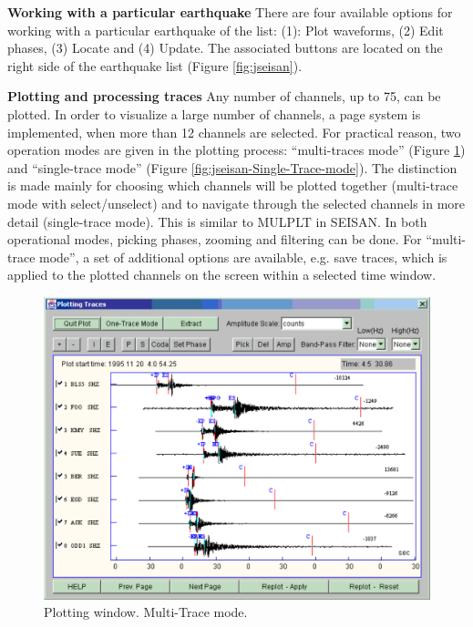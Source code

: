 \textbf{Working with a particular earthquake}\newline
There are four available options for working with a particular earthquake of the list: (1): Plot waveforms, (2) Edit phases, (3) Locate and (4) Update. The associated buttons are located on the right side of the earthquake list (Figure \ref{fig:jseisan}). 

\textbf{Plotting and processing traces}\newline
Any number of channels, up to 75, can be plotted. In order to visualize a large number of channels, a page system is implemented, when more than 12 channels are selected. For practical reason, two operation modes are given in the plotting process: 
``multi-traces mode'' (Figure \ref{fig:jseisan-Multi-Trace-mode}) and ``single-trace mode'' 
(Figure \ref{fig:jseisan-Single-Trace-mode}). 
The distinction is made mainly for choosing which channels will be plotted together (multi-trace mode with select/unselect) and to navigate through the selected channels in more detail (single-trace mode). This is similar to MULPLT in SEISAN. In both operational modes, picking phases, zooming and filtering can be done. For ``multi-trace mode'', a set of additional options are available, e.g. save traces, which is applied to the plotted channels on the screen within a selected time window. 

\begin{figure}
\centerline{\includegraphics[width=0.9\linewidth]{fig/fig9}}
\caption{ Plotting window. Multi-Trace mode.}
\label{fig:jseisan-Multi-Trace-mode}
\end{figure}

